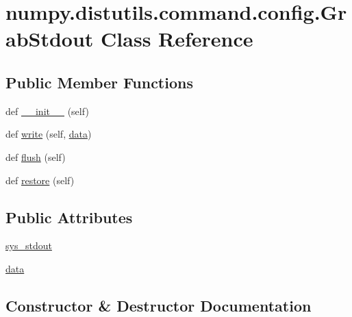 \hypertarget{classnumpy_1_1distutils_1_1command_1_1config_1_1GrabStdout}{}\section{numpy.\+distutils.\+command.\+config.\+Grab\+Stdout Class Reference}
\label{classnumpy_1_1distutils_1_1command_1_1config_1_1GrabStdout}
\subsection*{Public Member Functions}
\begin{DoxyCompactItemize}
\item 
def \hyperlink{classnumpy_1_1distutils_1_1command_1_1config_1_1GrabStdout_af6a5ca3865a4e225c20541c11575d2d7}{\+\_\+\+\_\+init\+\_\+\+\_\+} (self)
\item 
def \hyperlink{classnumpy_1_1distutils_1_1command_1_1config_1_1GrabStdout_a24bfba27fd490849abfeda70a92bdb78}{write} (self, \hyperlink{classnumpy_1_1distutils_1_1command_1_1config_1_1GrabStdout_a62933afbf2fe87e65694cac89eb693fa}{data})
\item 
def \hyperlink{classnumpy_1_1distutils_1_1command_1_1config_1_1GrabStdout_a1ef0629e30bf1a93aa9c9e750938fa7e}{flush} (self)
\item 
def \hyperlink{classnumpy_1_1distutils_1_1command_1_1config_1_1GrabStdout_a6277329e16627a40c37c633e5101c382}{restore} (self)
\end{DoxyCompactItemize}
\subsection*{Public Attributes}
\begin{DoxyCompactItemize}
\item 
\hyperlink{classnumpy_1_1distutils_1_1command_1_1config_1_1GrabStdout_a13cf6ed2687a837ba7d46b4b547a2f25}{sys\+\_\+stdout}
\item 
\hyperlink{classnumpy_1_1distutils_1_1command_1_1config_1_1GrabStdout_a62933afbf2fe87e65694cac89eb693fa}{data}
\end{DoxyCompactItemize}


\subsection{Constructor \& Destructor Documentation}
\mbox{\label{classnumpy_1_1distutils_1_1command_1_1config_1_1GrabStdout_af6a5ca3865a4e225c20541c11575d2d7}} 
